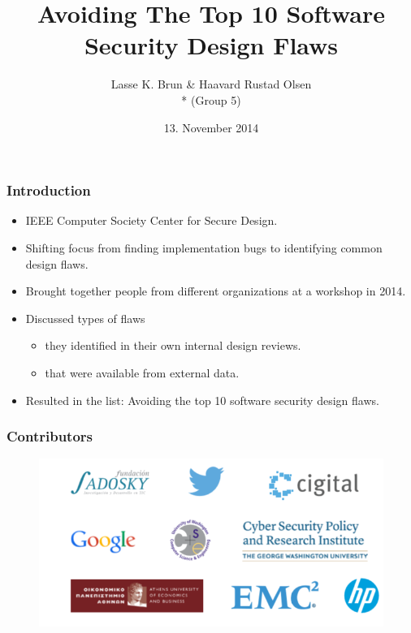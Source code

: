 \documentclass[12pt,norsk]{beamer}
\title[Avoiding The Top 10 Software Security Design Flaws]{Avoiding The Top 10 Software Security Design Flaws}
\author{Lasse K. Brun \& Haavard Rustad Olsen \\* (Group 5)} %
\institute[UiB]
{
\medskip
\textit{lkbrun@gmail.com \& haavard.olsen@live.com} \\* %
\textit{INF226 - Software Security, Fall 2014 }
}
\date{13. November 2014} %
\begin{document}
 

\begin{frame}
\titlepage %
\end{frame}


\begin{frame}
	
	\frametitle{Introduction}

	\begin{itemize}
		\item IEEE Computer Society Center for Secure Design.
		\item Shifting focus from finding implementation bugs to identifying common design flaws.
		\item Brought together people from different organizations at a workshop in 2014.
		\item Discussed types of flaws
		\begin{itemize}
			\item they identified in their own internal design reviews.
			\item that were available from external data.
		\end{itemize}
		\item Resulted in the list: Avoiding the top 10 software security design flaws.
	\end{itemize}		

\end{frame}


\begin{frame}
	
	\frametitle{Contributors}
	
	\begin{figure}[h]
    \centering
    \includegraphics[scale=0.50]{images/contributors.png}
    
\end{figure}
	
\end{frame}
\end{document}
